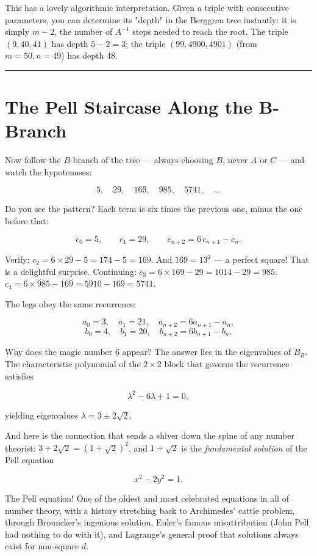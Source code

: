 \documentclass[11pt,openany]{book}
\theoremstyle{definition}
\theoremstyle{plain}
\theoremstyle{remark}
\begin{document}
This has a lovely algorithmic interpretation. Given a triple with consecutive parameters, you can determine its "depth" in the Berggren tree instantly: it is simply $m - 2$, the number of $A^{-1}$ steps needed to reach the root. The triple $(9, 40, 41)$ has depth $5 - 2 = 3$; the triple $(99, 4900, 4901)$ (from $m = 50, n = 49$) has depth 48.

\bigskip\noindent\rule{\textwidth}{0.4pt}\bigskip


\section*{The Pell Staircase Along the B-Branch}


Now follow the $B$-branch of the tree — always choosing $B$, never $A$ or $C$ — and watch the hypotenuses:

$$5, \quad 29, \quad 169, \quad 985, \quad 5741, \quad \ldots$$

Do you see the pattern? Each term is six times the previous one, minus the one before that:

$$c_0 = 5, \qquad c_1 = 29, \qquad c_{n+2} = 6\,c_{n+1} - c_n.$$

Verify: $c_2 = 6 \times 29 - 5 = 174 - 5 = 169$. And $169 = 13^2$ — a perfect square! That is a delightful surprise. Continuing: $c_3 = 6 \times 169 - 29 = 1014 - 29 = 985$. $c_4 = 6 \times 985 - 169 = 5910 - 169 = 5741$.

The legs obey the same recurrence:

$$a_0 = 3,\quad a_1 = 21,\quad a_{n+2} = 6a_{n+1} - a_n,$$
$$b_0 = 4,\quad b_1 = 20,\quad b_{n+2} = 6b_{n+1} - b_n.$$

Why does the magic number $6$ appear? The answer lies in the eigenvalues of $B_B$. The characteristic polynomial of the $2 \times 2$ block that governs the recurrence satisfies

$$\lambda^2 - 6\lambda + 1 = 0,$$

yielding eigenvalues $\lambda = 3 \pm 2\sqrt{2}$.

And here is the connection that sends a shiver down the spine of any number theorist: $3 + 2\sqrt{2} = (1 + \sqrt{2})^2$, and $1 + \sqrt{2}$ is the \textit{fundamental solution} of the Pell equation

$$x^2 - 2y^2 = 1.$$

The Pell equation! One of the oldest and most celebrated equations in all of number theory, with a history stretching back to Archimedes' cattle problem, through Brouncker's ingenious solution, Euler's famous misattribution (John Pell had nothing to do with it), and Lagrange's general proof that solutions always exist for non-square $d$.
\end{document}
